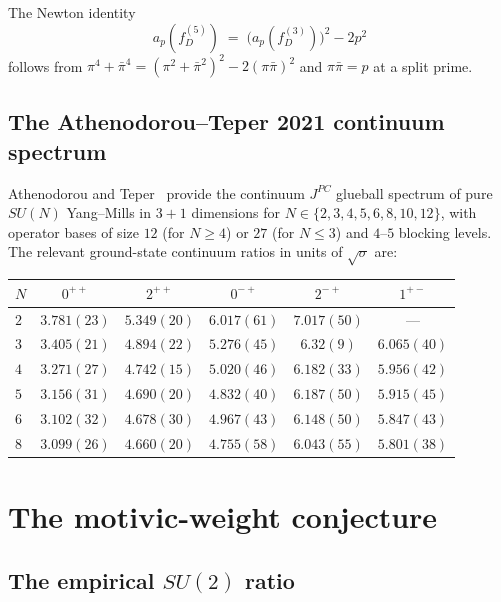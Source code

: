 \documentclass[11pt,a4paper]{amsart}
\theoremstyle{definition}
\begin{document}
The Newton identity
\begin{equation}\label{eq:newton}
a_{p}(f_{D}^{(5)}) \;=\; \bigl(a_{p}(f_{D}^{(3)})\bigr)^{2} - 2 p^{2}
\end{equation}
follows from $\pi^{4} + \bar\pi^{4} = (\pi^{2} + \bar\pi^{2})^{2} - 2 (\pi\bar\pi)^{2}$
and $\pi\bar\pi = p$ at a split prime.

\subsection{The Athenodorou--Teper 2021 continuum spectrum}\label{sec:AT2021}

Athenodorou and Teper~\cite[\S5.5, Tables~34--35]{AthenodorouTeper2021} provide
the continuum $J^{PC}$ glueball spectrum of pure $SU(N)$ Yang--Mills in $3+1$
dimensions for $N \in \{2, 3, 4, 5, 6, 8, 10, 12\}$, with operator bases
of size $12$ (for $N \ge 4$) or $27$ (for $N \le 3$) and $4$--$5$ blocking levels.
The relevant ground-state continuum ratios in units of $\sqrt{\sigma}$ are:
\begin{center}
\begin{tabular}{lccccc}
\toprule
$N$ & $0^{++}$ & $2^{++}$ & $0^{-+}$ & $2^{-+}$ & $1^{+-}$ \\
\midrule
$2$ & $3.781(23)$ & $5.349(20)$ & $6.017(61)$ & $7.017(50)$ & --- \\
$3$ & $3.405(21)$ & $4.894(22)$ & $5.276(45)$ & $6.32(9)$ & $6.065(40)$ \\
$4$ & $3.271(27)$ & $4.742(15)$ & $5.020(46)$ & $6.182(33)$ & $5.956(42)$ \\
$5$ & $3.156(31)$ & $4.690(20)$ & $4.832(40)$ & $6.187(50)$ & $5.915(45)$ \\
$6$ & $3.102(32)$ & $4.678(30)$ & $4.967(43)$ & $6.148(50)$ & $5.847(43)$ \\
$8$ & $3.099(26)$ & $4.660(20)$ & $4.755(58)$ & $6.043(55)$ & $5.801(38)$ \\
\bottomrule
\end{tabular}
\end{center}

\section{The motivic-weight conjecture}\label{sec:conjE1}

\subsection{The empirical $SU(2)$ ratio}\label{sec:E1-empirical}
\end{document}
